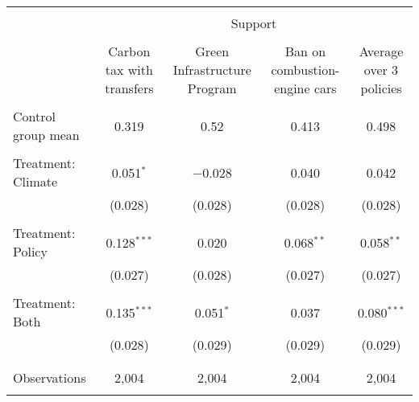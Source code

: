
\begin{tabular}{@{\extracolsep{5pt}}lcccc} 
\\[-1.8ex]\hline 
\hline \\[-1.8ex] 
 & \multicolumn{4}{c}{Support} \\ 
\cline{2-5} 
\\[-1.8ex] & Carbon tax with transfers & Green Infrastructure Program & Ban on combustion-engine cars & Average over 3 policies \\ 
\hline \\[-1.8ex] 
 Control group mean & 0.319 & 0.52 & 0.413 & 0.498  \\ \hline \\[-1.8ex] Treatment: Climate & 0.051$^{*}$ & $-$0.028 & 0.040 & 0.042 \\ 
  & (0.028) & (0.028) & (0.028) & (0.028) \\ 
  & & & & \\ 
 Treatment: Policy & 0.128$^{***}$ & 0.020 & 0.068$^{**}$ & 0.058$^{**}$ \\ 
  & (0.027) & (0.028) & (0.027) & (0.027) \\ 
  & & & & \\ 
 Treatment: Both & 0.135$^{***}$ & 0.051$^{*}$ & 0.037 & 0.080$^{***}$ \\ 
  & (0.028) & (0.029) & (0.029) & (0.029) \\ 
  & & & & \\ 
\hline \\[-1.8ex] 

Observations & 2,004 & 2,004 & 2,004 & 2,004 \\ 
\hline 
\hline \\[-1.8ex] 
\end{tabular} 